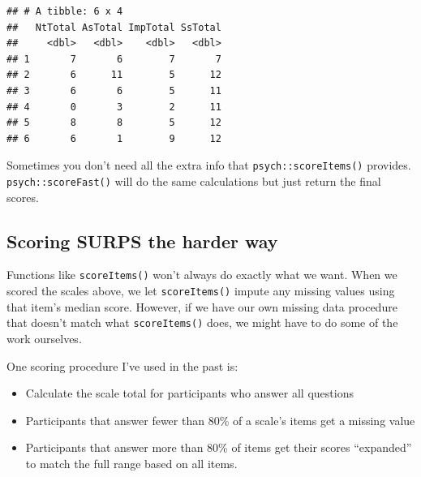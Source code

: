 \documentclass[
]{book}
\newenvironment{Shaded}{\begin{snugshade}}{\end{snugshade}}
\newcommand{\FunctionTok}[1]{\textcolor[rgb]{0.00,0.00,0.00}{#1}}
\newcommand{\NormalTok}[1]{#1}
\newcommand{\OtherTok}[1]{\textcolor[rgb]{0.56,0.35,0.01}{#1}}
\newcommand{\SpecialCharTok}[1]{\textcolor[rgb]{0.00,0.00,0.00}{#1}}
\newcommand{\StringTok}[1]{\textcolor[rgb]{0.31,0.60,0.02}{#1}}
\providecommand{\tightlist}{%
  \setlength{\itemsep}{0pt}\setlength{\parskip}{0pt}}
\begin{document}
\begin{Shaded}
\end{Shaded}

\begin{verbatim}
## # A tibble: 6 x 4
##   NtTotal AsTotal ImpTotal SsTotal
##     <dbl>   <dbl>    <dbl>   <dbl>
## 1       7       6        7       7
## 2       6      11        5      12
## 3       6       6        5      11
## 4       0       3        2      11
## 5       8       8        5      12
## 6       6       1        9      12
\end{verbatim}

\begin{note}
Sometimes you don't need all the extra info that
\texttt{psych::scoreItems()} provides. \texttt{psych::scoreFast()} will
do the same calculations but just return the final scores.
\end{note}

\hypertarget{scoring-surps-the-harder-way}{%
\subsection{Scoring SURPS the harder way}\label{scoring-surps-the-harder-way}}

Functions like \texttt{scoreItems()} won't always do exactly what we want.
When we scored the scales above, we let \texttt{scoreItems()} impute any missing
values using that item's median score. However, if we have our own missing
data procedure that doesn't match what \texttt{scoreItems()} does, we might have
to do some of the work ourselves.

One scoring procedure I've used in the past is:

\begin{itemize}
\tightlist
\item
  Calculate the scale total for participants who answer all questions
\item
  Participants that answer fewer than 80\% of a scale's items get a missing value
\item
  Participants that answer more than 80\% of items get their scores ``expanded''
  to match the full range based on all items.
\end{itemize}
\end{document}
